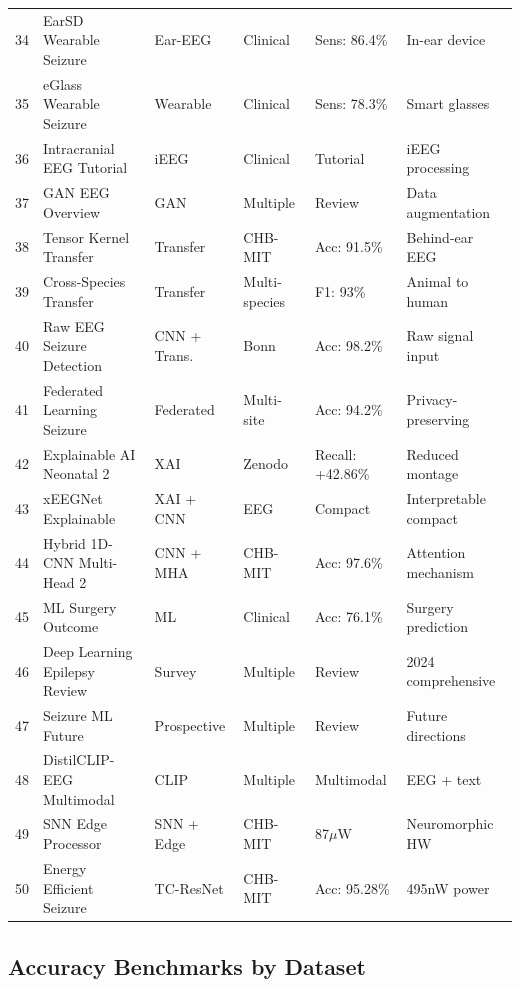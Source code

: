 \documentclass[12pt,a4paper]{article}
\begin{document}
\begin{longtable}{p{0.5cm}p{4cm}p{2.5cm}p{1.5cm}p{2cm}p{2cm}}
34 & EarSD Wearable Seizure & Ear-EEG & Clinical & Sens: 86.4\% & In-ear device \\
35 & eGlass Wearable Seizure & Wearable & Clinical & Sens: 78.3\% & Smart glasses \\
36 & Intracranial EEG Tutorial & iEEG & Clinical & Tutorial & iEEG processing \\
37 & GAN EEG Overview & GAN & Multiple & Review & Data augmentation \\
38 & Tensor Kernel Transfer & Transfer & CHB-MIT & Acc: 91.5\% & Behind-ear EEG \\
39 & Cross-Species Transfer & Transfer & Multi-species & F1: 93\% & Animal to human \\
40 & Raw EEG Seizure Detection & CNN + Trans. & Bonn & Acc: 98.2\% & Raw signal input \\
41 & Federated Learning Seizure & Federated & Multi-site & Acc: 94.2\% & Privacy-preserving \\
42 & Explainable AI Neonatal 2 & XAI & Zenodo & Recall: +42.86\% & Reduced montage \\
43 & xEEGNet Explainable & XAI + CNN & EEG & Compact & Interpretable compact \\
44 & Hybrid 1D-CNN Multi-Head 2 & CNN + MHA & CHB-MIT & Acc: 97.6\% & Attention mechanism \\
45 & ML Surgery Outcome & ML & Clinical & Acc: 76.1\% & Surgery prediction \\
46 & Deep Learning Epilepsy Review & Survey & Multiple & Review & 2024 comprehensive \\
47 & Seizure ML Future & Prospective & Multiple & Review & Future directions \\
48 & DistilCLIP-EEG Multimodal & CLIP & Multiple & Multimodal & EEG + text \\
49 & SNN Edge Processor & SNN + Edge & CHB-MIT & 87$\mu$W & Neuromorphic HW \\
50 & Energy Efficient Seizure & TC-ResNet & CHB-MIT & Acc: 95.28\% & 495nW power \\
\end{longtable}

\subsection{Accuracy Benchmarks by Dataset}
\end{document}
